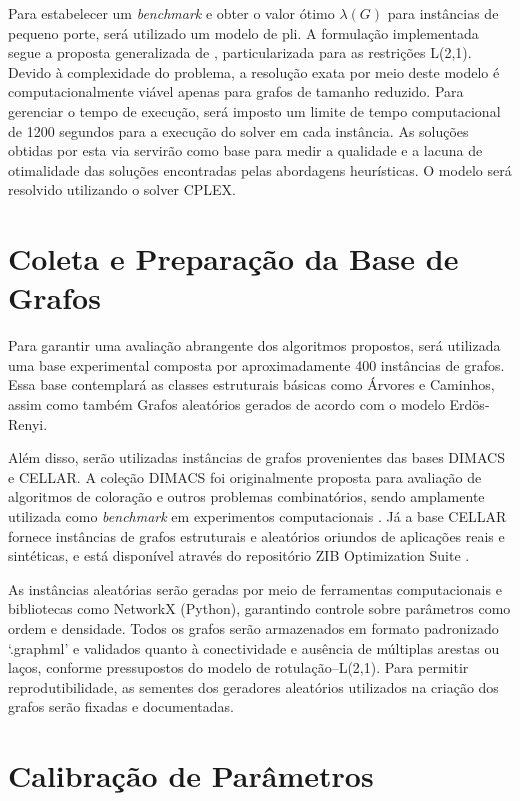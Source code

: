Para estabelecer um \textit{benchmark} e obter o valor ótimo $\lambda(G)$ para instâncias de pequeno porte, será utilizado um modelo de \gls{pli}. A formulação implementada segue a proposta generalizada de , particularizada para as restrições L(2,1). Devido à complexidade do problema, a resolução exata por meio deste modelo é computacionalmente viável apenas para grafos de tamanho reduzido. Para gerenciar o tempo de execução, será imposto um limite de tempo computacional de 1200 segundos para a execução do solver em cada instância. As soluções obtidas por esta via servirão como base para medir a qualidade e a lacuna de otimalidade das soluções encontradas pelas abordagens heurísticas. O modelo será resolvido utilizando o solver CPLEX.

\section{Coleta e Preparação da Base de Grafos}

Para garantir uma avaliação abrangente dos algoritmos propostos, será utilizada uma base experimental composta por aproximadamente 400 instâncias de grafos. Essa base contemplará as classes estruturais básicas como Árvores e Caminhos, assim como também Grafos aleatórios gerados de acordo com o modelo Erd\"{o}s-Renyi. 

Além disso, serão utilizadas instâncias de grafos provenientes das bases DIMACS e CELLAR. A coleção DIMACS foi originalmente proposta para avaliação de algoritmos de coloração e outros problemas combinatórios, sendo amplamente utilizada como \textit{benchmark} em experimentos computacionais \cite{nr, PorumbelGraphs}. Já a base CELLAR fornece instâncias de grafos estruturais e aleatórios oriundos de aplicações reais e sintéticas, e está disponível através do repositório ZIB Optimization Suite \cite{ZIB_FAP}. 

As instâncias aleatórias serão geradas por meio de ferramentas computacionais e bibliotecas como NetworkX (Python), garantindo controle sobre parâmetros como ordem e densidade. Todos os grafos serão armazenados em formato padronizado `.graphml' e validados quanto à conectividade e ausência de múltiplas arestas ou laços, conforme pressupostos do modelo de rotulação–L(2,1). Para permitir reprodutibilidade, as sementes dos geradores aleatórios utilizados na criação dos grafos serão fixadas e documentadas.

\section{Calibração de Parâmetros}

